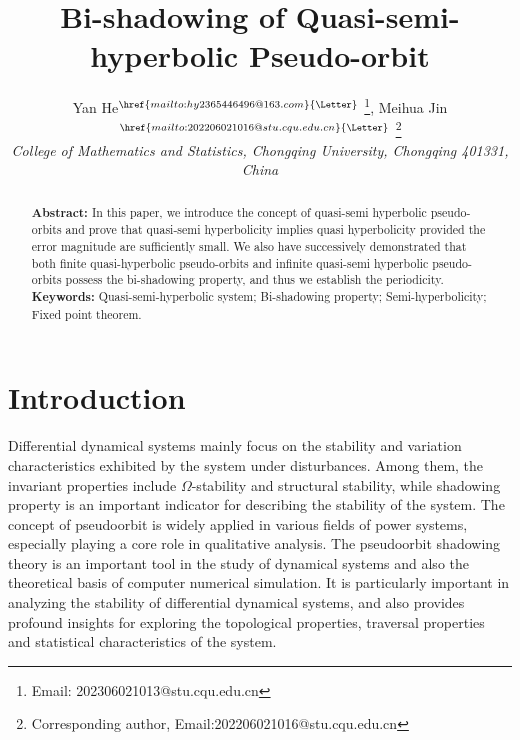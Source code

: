 \documentclass[12pt]{article}
\title{\textbf{Bi-shadowing of Quasi-semi-hyperbolic Pseudo-orbit}}
\author{
    Yan He$^{\href{mailto:hy2365446496@163.com}{\textnormal{\Letter}}}$
    \thanks{Email: {202306021013@stu.cqu.edu.cn}}, 
    Meihua  Jin$^{\href{mailto:202206021016@stu.cqu.edu.cn}{\textrm{\Letter}}}$
 \thanks{Corresponding author, Email:202206021016@stu.cqu.edu.cn}
    \\
    \small \textit{College of Mathematics and Statistics, Chongqing University, Chongqing 401331, China}
}
\date{}
\begin{document}
	\hfuzz=0.2pt  %
	\overfullrule=0pt  %
	
	\maketitle
	\renewcommand{\abstractname}{}
	\begin{abstract}
		\noindent\textbf{Abstract:} In this paper, we introduce the
		concept of quasi-semi hyperbolic pseudo-orbits and prove that
		quasi-semi hyperbolicity implies quasi hyperbolicity provided the
		error magnitude are sufficiently small. We also have successively
		demonstrated that both finite quasi-hyperbolic pseudo-orbits and
		infinite quasi-semi hyperbolic pseudo-orbits possess the
		bi-shadowing property, and thus we establish the periodicity.\\
		\noindent\textbf{Keywords:} Quasi-semi-hyperbolic system;
		Bi-shadowing property; Semi-hyperbolicity; Fixed point theorem.
	\end{abstract}

\section{Introduction}


\hspace{1em}Differential dynamical systems mainly focus on the stability and variation characteristics exhibited by the system under disturbances. Among them, the invariant properties include $ \Omega $-stability and structural stability, while shadowing property is an important indicator for describing the stability of the system. The concept of pseudoorbit is widely applied in various fields of power systems, especially playing a core role in qualitative analysis. The pseudoorbit shadowing theory is an important tool in the study of dynamical systems and also the theoretical basis of computer numerical simulation. It is particularly important in analyzing the stability of differential dynamical systems, and also provides profound insights for exploring the topological properties, traversal properties and statistical characteristics of the system.
\end{document}
